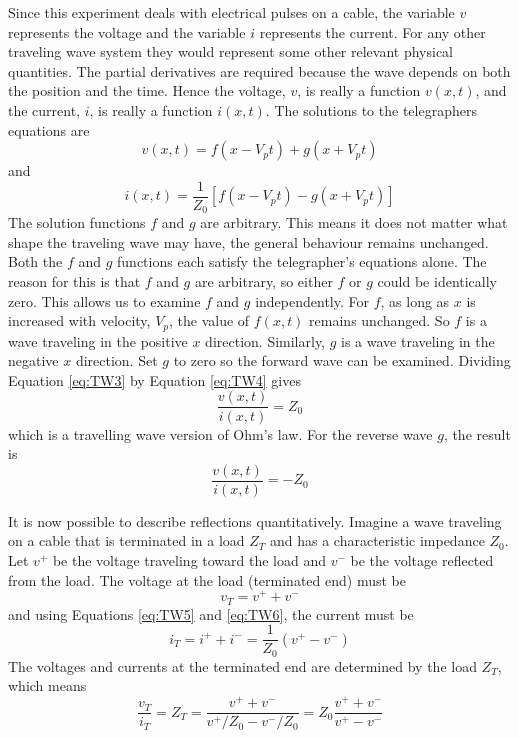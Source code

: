 \noindent Since this experiment deals with electrical pulses on a cable, the variable $v$ represents the voltage and the variable $i$ represents the current. For any other traveling wave system they would represent some other relevant physical quantities. The partial derivatives are required because the wave depends on both the position and the time. Hence the voltage, $v$, is really a function $v(x, t)$, and the current, $i$, is really a function $i(x, t)$. The solutions to the telegraphers equations are \begin{equation}\label{eq:TW3}
    v(x,t) = f(x-V_pt) + g(x+V_pt)
\end{equation}
and \begin{equation}\label{eq:TW4}
    i(x,t) = \frac{1}{Z_0}\left[f(x-V_pt) - g(x+V_pt)\right]
\end{equation}
The solution functions $f$ and $g$ are arbitrary. This means it does not matter what shape the traveling wave may have, the general behaviour remains unchanged. Both the $f$ and $g$ functions each satisfy the telegrapher’s equations alone. The reason for this is that $f$ and $g$ are arbitrary, so either $f$ or $g$ could be identically zero. This allows us to examine $f$ and $g$ independently. For $f$, as long as $x$ is increased with velocity, $V_p$, the value of $f(x, t)$ remains unchanged. So $f$ is a wave traveling in the positive $x$ direction. Similarly, $g$ is a wave traveling in the negative $x$ direction. Set $g$ to zero so the forward wave can be examined. Dividing Equation \ref{eq:TW3} by Equation \ref{eq:TW4} gives  \begin{equation}\label{eq:TW5} 
    \frac{v(x,t)}{i(x,t)} = Z_0
\end{equation}
which is a travelling wave version of Ohm's law. For the reverse wave $g$, the result is \begin{equation}\label{eq:TW6}
    \frac{v(x,t)}{i(x,t)} = -Z_0
\end{equation}

\noindent It is now possible to describe reflections quantitatively. Imagine a wave traveling on a cable that is terminated in a load $Z_T$ and has a characteristic impedance $Z_0$. Let $v^+$ be the voltage traveling toward the load and $v^-$ be the voltage reflected from the load. The voltage at the load (terminated end) must be \begin{equation}\label{eq:TW7}
    v_T = v^+ + v^-
\end{equation}
and using Equations \ref{eq:TW5} and \ref{eq:TW6}, the current must be \begin{equation}\label{eq:TW8}
    i_T = i^+ + i^- = \frac{1}{Z_0}(v^+-v^-)
\end{equation}
The voltages and currents at the terminated end are determined by the load $Z_T$, which means \begin{equation}\label{eq:TW9}
    \frac{v_T}{i_T} = Z_T = \frac{v^++v^-}{v^+/Z_0 - v^-/Z_0} = Z_0 \frac{v^+ + v^-}{v^+-v^-}
\end{equation}


